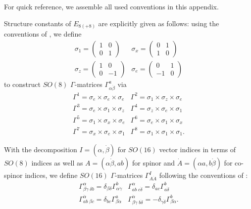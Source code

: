\documentclass[a4paper,12pt]{article}
\begin{document}
For quick reference, we assemble all used conventions in this
appendix.

Structure constants of $E_{8(+8)}$ are explicitly given as follows:
using the conventions of \cite{Green:sp}, we define
\begin{equation}
\begin{array}{ll}
\sigma_1=\left(\begin{array}{rr}1&0\\0&1\end{array}\right)&
\sigma_x=\left(\begin{array}{rr}0&1\\1&0\end{array}\right)\\
\sigma_z=\left(\begin{array}{rr}1&0\\0&-1\end{array}\right)&
\sigma_e=\left(\begin{array}{rr}0&1\\-1&0\end{array}\right)
\end{array}
\end{equation}
%
to construct $SO(8)$ $\Gamma$-matrices $\Gamma^a_{\alpha\dot\beta}$ via
\begin{equation}
\begin{array}{ll}
\Gamma^1=\sigma_e\times\sigma_e\times\sigma_e&
\Gamma^2=\sigma_1\times\sigma_z\times\sigma_e\\
\Gamma^3=\sigma_e\times\sigma_1\times\sigma_z&
\Gamma^4=\sigma_z\times\sigma_e\times\sigma_1\\
\Gamma^5=\sigma_1\times\sigma_x\times\sigma_e&
\Gamma^6=\sigma_e\times\sigma_1\times\sigma_x\\
\Gamma^7=\sigma_x\times\sigma_e\times\sigma_1&
\Gamma^8=\sigma_1\times\sigma_1\times\sigma_1.
\end{array}
\end{equation}

With the decomposition $I=(\alpha,\dot\beta)$ for $SO(16)$
vector indices in terms of $SO(8)$ indices as well as 
$A=(\alpha\dot\beta,ab)$ for spinor and
$\dot A=(\alpha a,b\dot\beta)$ for co-spinor indices,
we define $SO(16)$ $\Gamma$-matrices $\Gamma^I_{A\dot A}$ following
the conventions of \cite{Nicolai:1986jk}:
\begin{equation}
\begin{array}{ll}
\Gamma^\alpha_{\beta\dot\gamma\;\delta b}=\delta_{\beta\delta}\Gamma^b_{\alpha\dot\gamma}&
\Gamma^\alpha_{ab\;c\dot\delta}=\delta_{ac}\Gamma^b_{a\dot\delta}\\
\Gamma^{\dot\alpha}_{ab\;\beta c}=\delta_{bc}\Gamma^a_{\beta\dot\alpha}&
\Gamma^{\dot\alpha}_{\beta\dot\gamma\;b\dot\delta}=-\delta_{\dot\gamma\dot\delta}\Gamma^b_{\beta\dot\alpha}.
\end{array}
\end{equation}
\end{document}
